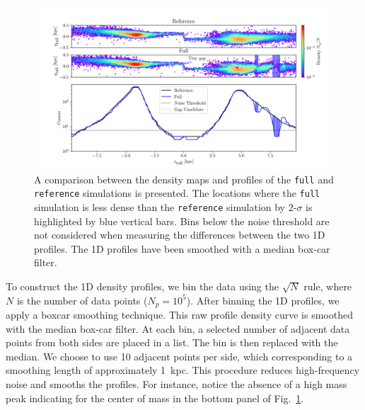 \documentclass[draft]{aa}
\begin{document}
\begin{appendix}
    \begin{figure}
      \centering
      \includegraphics[width=\linewidth, trim=20 0 15 0]{monte-carlo-009-pouliasis2017pii-GCNBody-2000-milisigma-5-noisefactor-20-boxcarindexlength-shifted-0.png}
      \caption{A comparison between the density maps and profiles of the \texttt{full} and \texttt{reference} simulations is presented. The locations where the \texttt{full} simulation is less dense than the \texttt{reference} simulation by 2-$\sigma$ is highlighted by blue vertical bars. Bins below the noise threshold are not considered when measuring the differences between the two 1D profiles. The 1D profiles have been smoothed with a median box-car filter.}
      \label{fig:profiles}
      \end{figure}

    To construct the 1D density profiles, we bin the data using the $\sqrt{N}$ rule, where $N$ is the number of data points ($N_p = 10^5$). After binning the 1D profiles, we apply a boxcar smoothing technique. This raw profile density curve is smoothed with the median box-car filter. At each bin, a selected number of adjacent data points from both sides are placed in a list. The bin is then replaced with the median. We choose to use 10 adjacent points per side, which corresponding to a smoothing length of approximately 1~kpc. This procedure reduces high-frequency noise and smooths the profiles. For instance, notice the absence of a high mass peak indicating for the center of mass in the bottom panel of Fig.~\ref{fig:profiles}.


\end{appendix}
\end{document}
